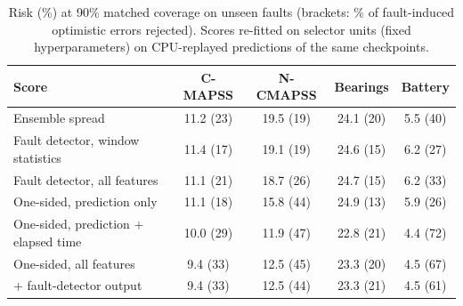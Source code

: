 \begin{table}[t]
\centering
\footnotesize
\setlength{\tabcolsep}{3pt}
\begin{tabular}{lcccc}
\hline
Score & C-MAPSS & N-CMAPSS & Bearings & Battery\\
\hline
Ensemble spread & 11.2 (23) & 19.5 (19) & 24.1 (20) & 5.5 (40)\\
Fault detector, window statistics & 11.4 (17) & 19.1 (19) & 24.6 (15) & 6.2 (27)\\
Fault detector, all features & 11.1 (21) & 18.7 (26) & 24.7 (15) & 6.2 (33)\\
One-sided, prediction only & 11.1 (18) & 15.8 (44) & 24.9 (13) & 5.9 (26)\\
One-sided, prediction + elapsed time & 10.0 (29) & 11.9 (47) & 22.8 (21) & 4.4 (72)\\
One-sided, all features & 9.4 (33) & 12.5 (45) & 23.3 (20) & 4.5 (67)\\
\quad + fault-detector output & 9.4 (33) & 12.5 (44) & 23.3 (21) & 4.5 (61)\\
\hline
\end{tabular}
\caption{Risk (\%) at 90\% matched coverage on unseen faults (brackets: \% of fault-induced optimistic errors rejected). Scores re-fitted on selector units (fixed hyperparameters) on CPU-replayed predictions of the same checkpoints.}
\label{tab:uses}
\end{table}
